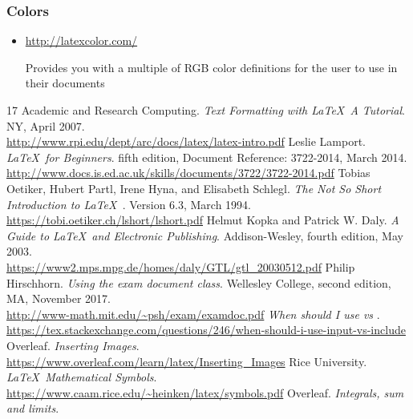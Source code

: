 		\subsubsection{Colors}
			\begin{itemize}
			\item \url{http://latexcolor.com/}
				\begin{absquote}
					Provides you with a multiple of RGB color definitions for the user to use in their documents
				\end{absquote}
			\end{itemize}
\newpage
	\begin{thebibliography}{17}
	\vspace{10.5cm}
		 Academic and Research Computing. \textit{Text Formatting with \LaTeX\ A Tutorial}. NY, April 2007.\\
				\url{http://www.rpi.edu/dept/arc/docs/latex/latex-intro.pdf}
		 Leslie Lamport. \textit{\LaTeX\ for Beginners}.  fifth edition, Document Reference: 3722-2014, March 2014.\\
				\url{http://www.docs.is.ed.ac.uk/skills/documents/3722/3722-2014.pdf}
		 Tobias Oetiker, Hubert Partl, Irene Hyna, and Elisabeth Schlegl. \textit{The Not So Short Introduction to \LaTeX\ }. Version 6.3, March 1994.\\
				\url{https://tobi.oetiker.ch/lshort/lshort.pdf}
		 Helmut Kopka and Patrick W. Daly. \textit{A Guide to \LaTeX\ and Electronic Publishing}. Addison-Wesley, fourth edition, May 2003.\\
				\url{https://www2.mps.mpg.de/homes/daly/GTL/gtl_20030512.pdf}
		 Philip Hirschhorn. \textit{Using the exam document class}. Wellesley College, second edition, MA, November 2017.\\
				\url{http://www-math.mit.edu/~psh/exam/examdoc.pdf}
		 \textit{When should I use  vs }.\\
				\url{https://tex.stackexchange.com/questions/246/when-should-i-use-input-vs-include}		
		 Overleaf. \textit{Inserting Images}.\\
				\url{https://www.overleaf.com/learn/latex/Inserting_Images}
		 Rice University. \textit{\LaTeX\ Mathematical Symbols}.\\
			\url{https://www.caam.rice.edu/~heinken/latex/symbols.pdf}
		 Overleaf. \textit{Integrals, sum and limits}.\\

\end{thebibliography}

